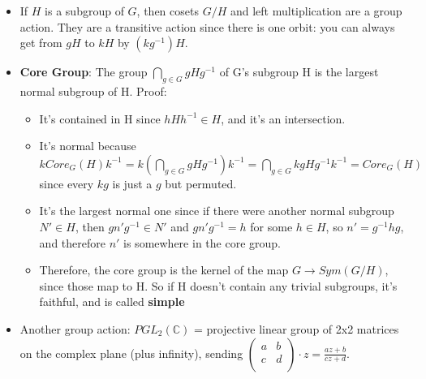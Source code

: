 \documentclass[11pt, oneside]{article}   	%
\begin{document}
\begin{itemize}
\begin {itemize}
  \item If $H$ is a subgroup of $G$, then cosets $G / H$ and left multiplication are a group action.  They are a transitive action since there is one orbit: you can always get from $gH$ to $kH$ by $(kg^{-1})H$.
  \item \textbf{Core Group}: The group $\bigcap_{g \in G} gHg^{-1}$ of G's subgroup H is the largest normal subgroup of H.  Proof:
  \begin{itemize}
  \item It's contained in H since $hHh^{-1} \in H$, and it's an intersection.
  \item It's normal because $kCore_G(H)k^{-1} = k (\bigcap_{g \in G} gHg^{-1}) k^{-1}  = \bigcap_{g \in G} kgHg^{-1}k^{-1} = Core_G(H)$ since every $kg$ is just a $g$ but permuted. 
  \item It's the largest normal one since if there were another normal subgroup $N' \in H$, then $gn'g^{-1} \in N'$ and $gn'g^{-1} = h$ for some $h \in H$, so $n' = g^{-1}hg$, and therefore $n'$ is somewhere in the core group.
  \item Therefore, the core group is the kernel of the map $G \rightarrow Sym(G/H)$, since those map to H.  So if H doesn't contain any trivial subgroups, it's faithful, and is called \textbf{simple}
  \end{itemize}	  
  \item Another group action: $PGL_2(\mathbb{C})$ = projective linear group of 2x2 matrices on the complex plane (plus infinity), sending $\begin{pmatrix} a & b \\ c & d\\ \end{pmatrix} \cdot z = \frac{az+b}{cz+d}$.  
  
  \end{itemize}
  


\end{itemize}
\end{document}
